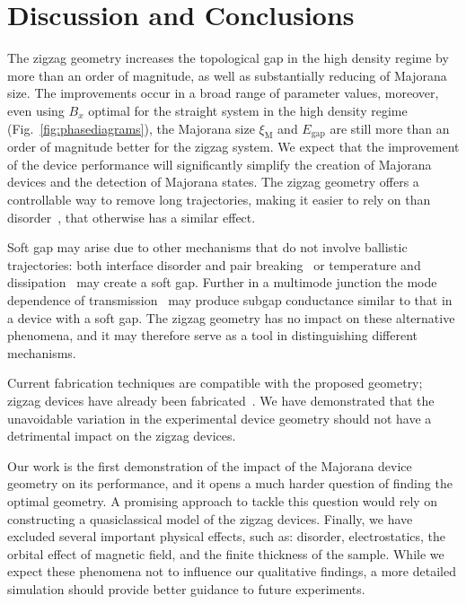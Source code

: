 \documentclass[english, twocolumn, 10pt, aps, superscriptaddress, floatfix, prb, citeautoscript]{revtex4-1}
\renewcommand{\comment}[2]{#2}
\begin{document}
\section{Discussion and Conclusions}

\comment{The zigzag geometry is a controllable tool in hardening the gap and decreasing Majorana size.}
The zigzag geometry increases the topological gap in the high density regime by more than an order of magnitude, as well as substantially reducing of Majorana size.
The improvements occur in a broad range of parameter values, moreover, even using $B_x$ optimal for the straight system in the high density regime (Fig.~\ref{fig:phasediagrams}), the Majorana size $\xi_\textrm{M}$ and $E_\textrm{gap}$ are still more than an order of magnitude better for the zigzag system.
We expect that the improvement of the device performance will significantly simplify the creation of Majorana devices and the detection of Majorana states.
The zigzag geometry offers a controllable way to remove long trajectories, making it easier to rely on than disorder~\cite{Haim2019}, that otherwise has a similar effect.

\comment{Zigzag doesn't do anything against other mechanisms, and therefore it doesn't help to use it ignorantly}
Soft gap may arise due to other mechanisms that do not involve ballistic trajectories: both interface disorder and pair breaking~\cite{Takei2013} or temperature and dissipation~\cite{Liu2017} may create a soft gap.
Further in a multimode junction the mode dependence of transmission~\cite{Stanescu2014} may produce subgap conductance similar to that in a device with a soft gap.
The zigzag geometry has no impact on these alternative phenomena, and it may therefore serve as a tool in distinguishing different mechanisms.

\comment{Current fabrication techniques are compatible with the proposed geometry, and experimental verification can be near.}
Current fabrication techniques are compatible with the proposed geometry; zigzag devices have already been fabricated~\cite{Vries}.
We have demonstrated that the unavoidable variation in the experimental device geometry should not have a detrimental impact on the zigzag devices.

\comment{Optimizing the geometry, more detailed modeling, and a simple analytical estimation are open questions for further research}
Our work is the first demonstration of the impact of the Majorana device geometry on its performance, and it opens a much harder question of finding the optimal geometry.
A promising approach to tackle this question would rely on constructing a quasiclassical model of the zigzag devices.
Finally, we have excluded several important physical effects, such as: disorder, electrostatics, the orbital effect of magnetic field, and the finite thickness of the sample.
While we expect these phenomena not to influence our qualitative findings, a more detailed simulation should provide better guidance to future experiments.
\end{document}

